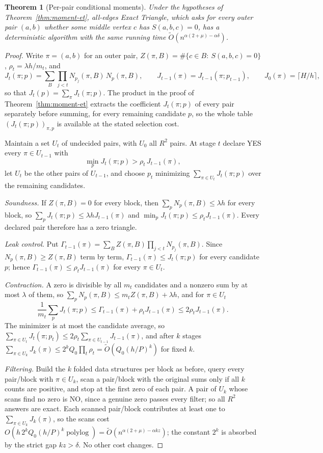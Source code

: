 \documentclass[11pt]{article}
\newtheorem{theorem}{Theorem}
\newcommand{\softO}{\widetilde O}
\begin{document}
\begin{theorem}[Per-pair conditional moments]
\label{thm:per-pair-moments}
Under the hypotheses of Theorem~\ref{thm:moment-et}, all-edges Exact
Triangle, which asks for every outer pair $(a,b)$ whether some middle
vertex $c$ has $S(a,b,c)=0$, has a deterministic algorithm with the same
running time $\softO(n^{\alpha(2+\mu)-\alpha\delta})$.
\end{theorem}
\begin{proof}
Write $\pi=(a,b)$ for an outer pair, $Z(\pi,B)=\#\{c\in B:\ S(a,b,c)=0\}$,
$\rho_t=\lambda h/m_t$, and
\[
J_t(\pi;p)=\sum_B\prod_{j<t}N_{p_j}(\pi,B)\,N_p(\pi,B),\qquad
J_{t-1}(\pi)=J_{t-1}(\pi;p_{t-1}),\qquad J_0(\pi)=\lceil H/h\rceil,
\]
so that $J_t(p)=\sum_\pi J_t(\pi;p)$. The product in the proof of
Theorem~\ref{thm:moment-et} extracts the coefficient $J_t(\pi;p)$ of every
pair separately before summing, for every remaining candidate $p$, so the
whole table $(J_t(\pi;p))_{\pi,p}$ is available at the stated selection
cost.

Maintain a set $U_t$ of undecided pairs, with $U_0$ all $R^2$ pairs. At
stage $t$ declare YES every $\pi\in U_{t-1}$ with
\[
\min_{p}J_t(\pi;p)>\rho_t\,J_{t-1}(\pi),
\]
let $U_t$ be the other pairs of $U_{t-1}$, and choose $p_t$ minimizing
$\sum_{\pi\in U_t}J_t(\pi;p)$ over the remaining candidates.

\emph{Soundness.} If $Z(\pi,B)=0$ for every block, then
$\sum_pN_p(\pi,B)\le\lambda h$ for every block, so
$\sum_pJ_t(\pi;p)\le\lambda hJ_{t-1}(\pi)$ and
$\min_pJ_t(\pi;p)\le\rho_tJ_{t-1}(\pi)$. Every declared pair therefore has
a zero triangle.

\emph{Leak control.} Put
$\Gamma_{t-1}(\pi)=\sum_BZ(\pi,B)\prod_{j<t}N_{p_j}(\pi,B)$. Since
$N_p(\pi,B)\ge Z(\pi,B)$ term by term, $\Gamma_{t-1}(\pi)\le J_t(\pi;p)$
for every candidate $p$; hence $\Gamma_{t-1}(\pi)\le\rho_tJ_{t-1}(\pi)$ for
every $\pi\in U_t$.

\emph{Contraction.} A zero is divisible by all $m_t$ candidates and a nonzero
sum by at most $\lambda$ of them, so
$\sum_pN_p(\pi,B)\le m_tZ(\pi,B)+\lambda h$, and for $\pi\in U_t$
\[
\frac1{m_t}\sum_pJ_t(\pi;p)\le\Gamma_{t-1}(\pi)+\rho_tJ_{t-1}(\pi)
\le2\rho_tJ_{t-1}(\pi).
\]
The minimizer is at most the candidate average, so
$\sum_{\pi\in U_t}J_t(\pi;p_t)\le2\rho_t\sum_{\pi\in U_{t-1}}J_{t-1}(\pi)$,
and after $k$ stages
$\sum_{\pi\in U_k}J_k(\pi)\le2^kQ_0\prod_t\rho_t=\widetilde O(Q_0(h/P)^k)$
for fixed $k$.

\emph{Filtering.} Build the $k$ folded data structures per block as before,
query every pair/block with $\pi\in U_k$, scan a pair/block with the
original sums only if all $k$ counts are positive, and stop at the first
zero of each pair. A pair of $U_k$ whose scans find no zero is NO, since a
genuine zero passes every filter; so all $R^2$ answers are exact. Each
scanned pair/block contributes at least one to $\sum_{\pi\in U_k}J_k(\pi)$,
so the scans cost $O(h\,2^kQ_0(h/P)^k\operatorname{polylog})
=\softO(n^{\alpha(2+\mu)-\alpha kz})$; the constant $2^k$ is absorbed by
the strict gap $kz>\delta$. No other cost changes.
\end{proof}
\end{document}
